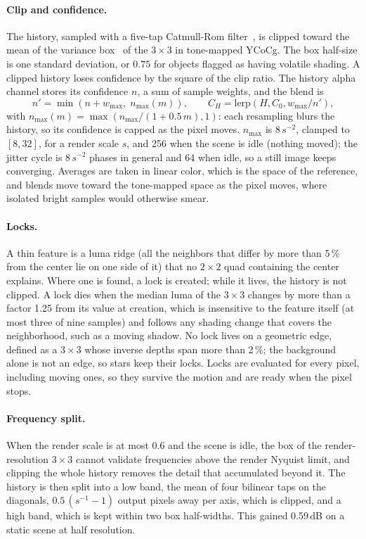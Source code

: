 \documentclass[11pt,a4paper]{article}
\begin{document}
\paragraph{Clip and confidence.} The history, sampled with a five-tap Catmull-Rom filter~\cite{jimenez2016filmic}, is clipped toward the mean of the variance box~\cite{salvi2016taa} of the $3\times3$ in tone-mapped YCoCg. The box half-size is one standard deviation, or $0.75$ for objects flagged as having volatile shading. A clipped history loses confidence by the square of the clip ratio. The history alpha channel stores its confidence $n$, a sum of sample weights, and the blend is
\begin{equation}
n' = \min(n + w_{\max},\; n_{\max}(m)), \qquad C_H = \mathrm{lerp}(H, C_0, w_{\max}/n'),
\end{equation}
with $n_{\max}(m) = \max(n_{\max}/(1+0.5\,m), 1)$: each resampling blurs the history, so its confidence is capped as the pixel moves. $n_{\max}$ is $8\,s^{-2}$, clamped to $[8,32]$, for a render scale $s$, and 256 when the scene is idle (nothing moved); the jitter cycle is $8\,s^{-2}$ phases in general and 64 when idle, so a still image keeps converging. Averages are taken in linear color, which is the space of the reference, and blends move toward the tone-mapped space as the pixel moves, where isolated bright samples would otherwise smear.

\paragraph{Locks.} A thin feature is a luma ridge (all the neighbors that differ by more than 5\,\% from the center lie on one side of it) that no $2\times2$ quad containing the center explains. Where one is found, a lock is created; while it lives, the history is not clipped. A lock dies when the median luma of the $3\times3$ changes by more than a factor 1.25 from its value at creation, which is insensitive to the feature itself (at most three of nine samples) and follows any shading change that covers the neighborhood, such as a moving shadow. No lock lives on a geometric edge, defined as a $3\times3$ whose inverse depths span more than 2\,\%; the background alone is not an edge, so stars keep their locks. Locks are evaluated for every pixel, including moving ones, so they survive the motion and are ready when the pixel stops.

\paragraph{Frequency split.} When the render scale is at most 0.6 and the scene is idle, the box of the render-resolution $3\times3$ cannot validate frequencies above the render Nyquist limit, and clipping the whole history removes the detail that accumulated beyond it. The history is then split into a low band, the mean of four bilinear taps on the diagonals, $0.5\,(s^{-1}-1)$ output pixels away per axis, which is clipped, and a high band, which is kept within two box half-widths. This gained 0.59\,dB on a static scene at half resolution.
\end{document}
